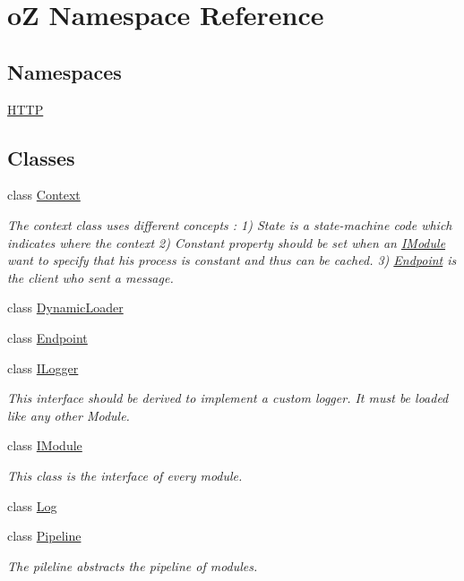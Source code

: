 \hypertarget{namespaceo_z}{}\section{oZ Namespace Reference}
\label{namespaceo_z}
\subsection*{Namespaces}
\begin{DoxyCompactItemize}
\item 
 \mbox{\hyperlink{namespaceo_z_1_1_h_t_t_p}{H\+T\+TP}}
\end{DoxyCompactItemize}
\subsection*{Classes}
\begin{DoxyCompactItemize}
\item 
class \mbox{\hyperlink{classo_z_1_1_context}{Context}}
\begin{DoxyCompactList}\small\item\em The context class uses different concepts \+: 1) State is a state-\/machine code which indicates where the context 2) Constant property should be set when an \mbox{\hyperlink{classo_z_1_1_i_module}{I\+Module}} want to specify that his process is constant and thus can be cached. 3) \mbox{\hyperlink{classo_z_1_1_endpoint}{Endpoint}} is the client who sent a message. \end{DoxyCompactList}\item 
class \mbox{\hyperlink{classo_z_1_1_dynamic_loader}{Dynamic\+Loader}}
\item 
class \mbox{\hyperlink{classo_z_1_1_endpoint}{Endpoint}}
\item 
class \mbox{\hyperlink{classo_z_1_1_i_logger}{I\+Logger}}
\begin{DoxyCompactList}\small\item\em This interface should be derived to implement a custom logger. It must be loaded like any other Module. \end{DoxyCompactList}\item 
class \mbox{\hyperlink{classo_z_1_1_i_module}{I\+Module}}
\begin{DoxyCompactList}\small\item\em This class is the interface of every module. \end{DoxyCompactList}\item 
class \mbox{\hyperlink{classo_z_1_1_log}{Log}}
\item 
class \mbox{\hyperlink{classo_z_1_1_pipeline}{Pipeline}}
\begin{DoxyCompactList}\small\item\em The pileline abstracts the pipeline of modules. \end{DoxyCompactList}\end{DoxyCompactItemize}
